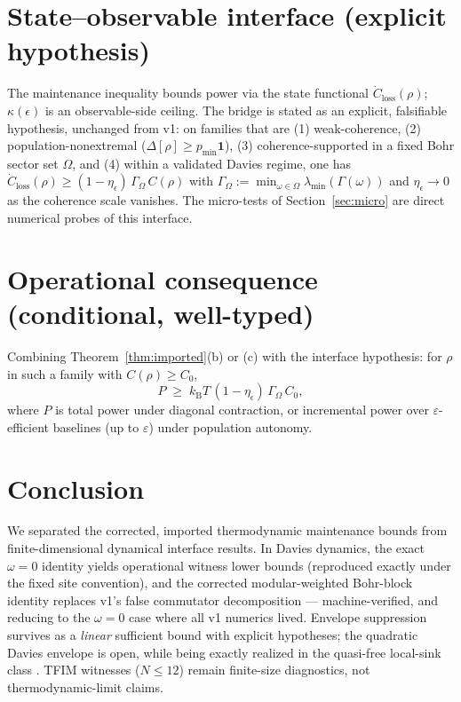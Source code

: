 \documentclass[11pt,a4paper]{article}
\theoremstyle{plain}
\theoremstyle{definition}
\theoremstyle{remark}
\newcommand{\kB}{k_{\mathrm{B}}}
\newcommand{\eps}{\epsilon}
\begin{document}
\section{State--observable interface (explicit hypothesis)}
\label{sec:interface}

The maintenance inequality bounds power via the state functional
$\dot{C}_{\mathrm{loss}}(\rho)$; $\kappa(\eps)$ is an observable-side ceiling.
The bridge is stated as an explicit, falsifiable hypothesis, unchanged from
v1: on families that are (1) weak-coherence, (2) population-nonextremal
($\Delta[\rho] \ge p_{\min}\mathbf{1}$), (3) coherence-supported in a fixed
Bohr sector set $\Omega$, and (4) within a validated Davies regime, one has
$\dot{C}_{\mathrm{loss}}(\rho) \ge (1 - \eta_\eps)\,\Gamma_\Omega\, C(\rho)$
with $\Gamma_\Omega := \min_{\omega\in\Omega}\lambda_{\min}(\Gamma(\omega))$
and $\eta_\eps \to 0$ as the coherence scale vanishes. The micro-tests of
Section~\ref{sec:micro} are direct numerical probes of this interface.

\section{Operational consequence (conditional, well-typed)}

Combining Theorem~\ref{thm:imported}(b) or (c) with the interface hypothesis:
for $\rho$ in such a family with $C(\rho) \ge C_0$,
\begin{equation}
P \;\ge\; \kB T\,(1 - \eta_\eps)\,\Gamma_\Omega\, C_0,
\end{equation}
where $P$ is total power under diagonal contraction, or incremental power
over $\varepsilon$-efficient baselines (up to $\varepsilon$) under population
autonomy.

\section{Conclusion}

We separated the corrected, imported thermodynamic maintenance bounds from
finite-dimensional dynamical interface results. In Davies dynamics, the exact
$\omega = 0$ identity yields operational witness lower bounds (reproduced
exactly under the fixed site convention), and the corrected modular-weighted
Bohr-block identity replaces v1's false commutator decomposition ---
machine-verified, and reducing to the $\omega = 0$ case where all v1
numerics lived. Envelope suppression survives as a \emph{linear} sufficient
bound with explicit hypotheses; the quadratic Davies envelope is open, while
being exactly realized in the quasi-free local-sink class \cite{HCut}. TFIM
witnesses ($N \le 12$) remain finite-size diagnostics, not
thermodynamic-limit claims.
\end{document}
